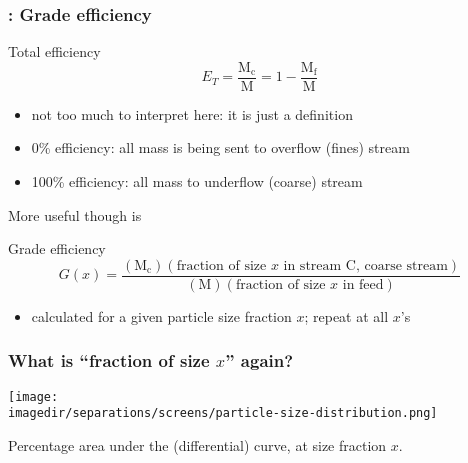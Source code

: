 \begin{frame}\frametitle{{\color{myOrange}{Concept}}: Grade efficiency}
	\begin{exampleblock}{Total efficiency}
		\[E_T = \displaystyle \frac{\text{M}_\text{c}}{\text{M}} = 1 - \displaystyle \frac{\text{M}_\text{f}}{\text{M}}\]
	\end{exampleblock}
	\begin{itemize}
		\item	not too much to interpret here: it is just a definition
		\item	0\% efficiency: all mass is being sent to overflow (fines) stream
		\item	100\% efficiency: all mass to underflow (coarse) stream
	\end{itemize}
	\vspace{12pt}
	More useful though is
	\begin{exampleblock}{Grade efficiency}
		\[G(x) = \displaystyle \frac{(\text{M}_\text{c})(\text{fraction of size $x$ in stream C, coarse stream})}{(\text{M})(\text{fraction of size $x$ in feed})}\]
	\end{exampleblock}
	\begin{itemize}
		\item	calculated for a given particle size fraction $x$; repeat at all $x$'s
	\end{itemize}
\end{frame}

\begin{frame}\frametitle{What is ``fraction of size $x$'' again?}
	\begin{center}
		\texttt{[image: \\imagedir/separations/screens/particle-size-distribution.png]}
	\end{center}
	Percentage area under the (differential) curve, at size fraction $x$.
\end{frame}

